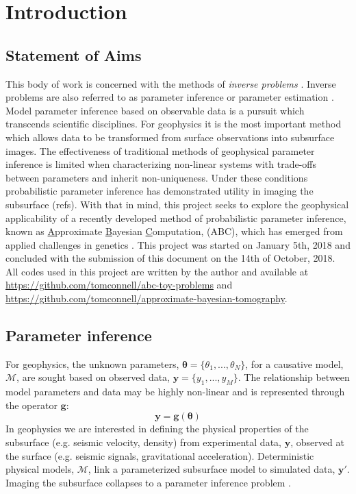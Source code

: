 \chapter{Introduction}


\section{Statement of Aims} 

This body of work is concerned with the methods of \textit{inverse problems} \citep{Tarantola2005,Aster2013,Menke2012,Kaipio2006,Biegler2010,Idier2013}. Inverse problems are also referred to as parameter inference or parameter estimation \citep{Box1973,Sprott2008,Casella1993,Cox2007}. Model parameter inference based on observable data is a pursuit which transcends scientific disciplines. For geophysics it is the most important method which allows data to be transformed from surface observations into subsurface images. The effectiveness of traditional methods of geophysical parameter inference is limited when characterizing non-linear systems with trade-offs between parameters and inherit non-uniqueness. Under these conditions probabilistic parameter inference has demonstrated utility in imaging the subsurface (refs). With that in mind, this project seeks to explore the geophysical applicability of a recently developed method of probabilistic parameter inference, known as \underline{A}pproximate \underline{B}ayesian \underline{C}omputation, (ABC), which has emerged from applied challenges in genetics \citep{Tavare1997,Beaumont2002,Sunnaker2013}. This project was started on January 5th, 2018 and concluded with the submission of this document on the 14th of October, 2018. All codes used in this project are written by the author and available at \url{https://github.com/tomconnell/abc-toy-problems} and \url{https://github.com/tomconnell/approximate-bayesian-tomography}.

\section{Parameter inference}

For geophysics, the unknown parameters, $\bm{\theta} = \{\theta_1,...,\theta_N\}$, for a causative model, $\mathcal{M}$, are sought based on observed data, $\bm{y} = \{y_1,...,y_M\}$. The relationship between model parameters and data may be highly non-linear and is represented through the operator $\bm{g}$:
\begin{equation}
\bm{y} = \bm{g}(\bm{\theta})
\label{basic_data_parameters}
\end{equation}
In geophysics we are interested in defining the physical properties  of the subsurface (e.g. seismic velocity, density) from experimental data, $\bm{y}$, observed at the surface (e.g. seismic signals, gravitational acceleration). Deterministic physical models, $\mathcal{M}$, link a parameterized subsurface model to simulated data, $\bm{y'}$. Imaging the subsurface collapses to a parameter inference problem \citep[p.1-2]{Tarantola2005}.\par


